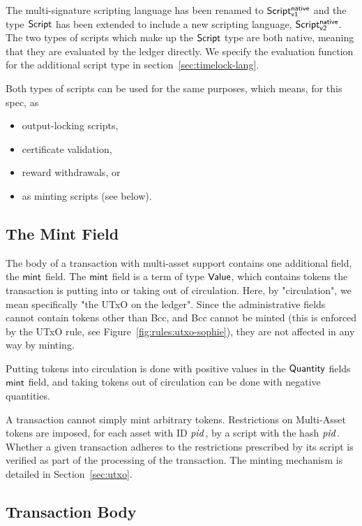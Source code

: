 The multi-signature scripting language has been renamed to $\mathsf{Script^{native}_{v1}}$ and
the type $\mathsf{Script}$ has been extended to include a new scripting language,
$\mathsf{Script^{native}_{v2}}$. The two types of scripts which make up the $\mathsf{Script}$ type are both
native, meaning
that they are evaluated by the ledger directly. We specify the evaluation
function for the additional script type in section~\ref{sec:timelock-lang}.

Both types of scripts can be used for the same purposes, which means, for this
spec, as

\begin{itemize}
  \item output-locking scripts,
  \item certificate validation,
  \item reward withdrawals, or
  \item as minting scripts (see below).
\end{itemize}

\subsection*{The Mint Field}

The body of a transaction with multi-asset support contains one additional
field, the $\mathsf{mint}$ field.
The $\mathsf{mint}$ field is a term of type $\mathsf{Value}$, which contains
tokens the transaction is putting into or taking out of
circulation. Here, by "circulation", we mean specifically "the UTxO on the
ledger". Since the administrative fields cannot contain tokens other than Bcc,
and Bcc cannot be minted (this is enforced by the UTxO rule, see Figure~\ref{fig:rules:utxo-sophie}),
they are not affected in any way by minting.

Putting tokens into circulation is done with positive values in the $\mathsf{Quantity}$
fields $\mathsf{mint}$ field, and taking tokens out of circulation can be done
with negative quantities.

A transaction cannot simply mint arbitrary tokens. Restrictions on
Multi-Asset tokens are imposed, for each asset with ID $\mathit{pid}$, by a script
with the hash $\mathit{pid}$. Whether a given transaction adheres to the restrictions
prescribed by its script is verified as part of the processing of the transaction.
The minting mechanism is detailed in Section~\ref{sec:utxo}.

\subsection*{Transaction Body}

